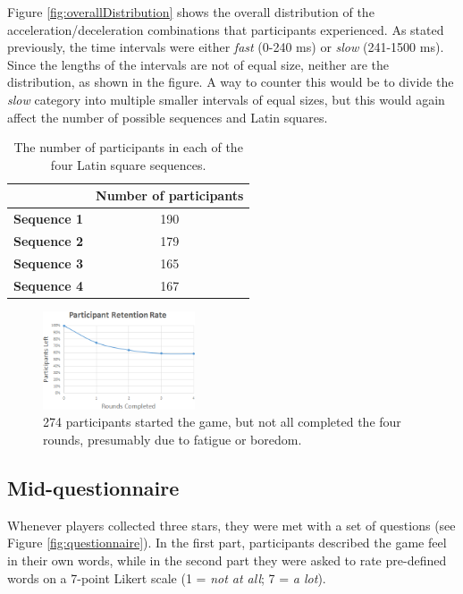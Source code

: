 Figure \ref{fig:overallDistribution} shows the overall distribution of the acceleration/deceleration combinations that participants experienced. As stated previously, the time intervals were either \textit{fast} (0-240 ms) or \textit{slow} (241-1500 ms). Since the lengths of the intervals are not of equal size, neither are the distribution, as shown in the figure. A way to counter this would be to divide the \textit{slow} category into multiple smaller intervals of equal sizes, but this would again affect the number of possible sequences and Latin squares.

\begin{table} \centering
\caption{The number of participants in each of the four Latin square sequences.}
\label{table:latinSequenceNumber}
\begin{tabular}{cc}
\toprule
& \textbf{Number of participants}\\
\midrule
\textbf{Sequence 1} & 190\\
\textbf{Sequence 2} & 179\\
\textbf{Sequence 3} & 165\\
\textbf{Sequence 4} & 167\\
\bottomrule
\end{tabular}
\end{table}

\begin{figure}[htbp]
\centering
\includegraphics[width=0.4\textwidth]{Pics/retetionRate}
\caption{274 participants started the game, but not all completed the four rounds, presumably due to fatigue or boredom.}
\label{fig:retention}
\end{figure}

\subsection{Mid-questionnaire}
Whenever players collected three stars, they were met with a set of questions (see Figure \ref{fig:questionnaire}). In the first part, participants described the game feel in their own words, while in the second part they were asked to rate pre-defined words on a 7-point Likert scale (1 = \textit{not at all}; 7 = \textit{a lot}).

